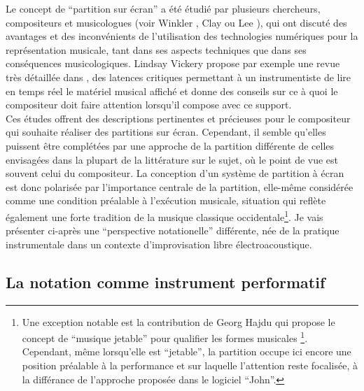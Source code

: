 \indent Le concept de ``partition sur écran'' a été étudié par plusieurs chercheurs, compositeurs et musicologues (voir Winkler \cite{winkler_real-time_2004}, Clay \cite{adams_inventing_2008} ou Lee \cite{lee_real-time_2012}), qui ont discuté des avantages et des inconvénients de l'utilisation des technologies numériques pour la représentation musicale, tant dans ses aspects techniques que dans ses conséquences musicologiques. Lindsay Vickery propose par exemple une revue très détaillée dans \cite{vickery_limitations_2014}, des latences critiques permettant à un instrumentiste de lire en temps réel le matériel musical affiché et donne des conseils sur ce à quoi le compositeur doit faire attention lorsqu'il compose avec ce support.\\
\indent Ces études offrent des descriptions pertinentes et précieuses pour le compositeur qui souhaite réaliser des partitions sur écran. Cependant, il semble qu'elles puissent être complétées par une approche de la partition différente de celles envisagées dans la plupart de la littérature sur le sujet, où le point de vue est souvent celui du compositeur. La conception d'un système de partition à écran est donc polarisée par l'importance centrale de la partition, elle-même considérée comme une condition préalable à l'exécution musicale, situation qui reflète également une forte tradition de la musique classique occidentale\footnote{Une exception notable est la contribution de Georg Hajdu \cite{hajdu_disposable_2016} qui propose le concept de ``musique jetable'' pour qualifier les formes musicales \footnote{}. Cependant, même lorsqu'elle est ``jetable'', la partition occupe ici encore une position préalable à la performance et sur laquelle l'attention reste focalisée, à la différance de l'approche proposée dans le logiciel ``John''.}. Je vais présenter ci-après une ``perspective notationelle'' différente, née de la pratique instrumentale dans un contexte d'improvisation libre électroacoustique.


\subsection{La notation comme instrument performatif}

